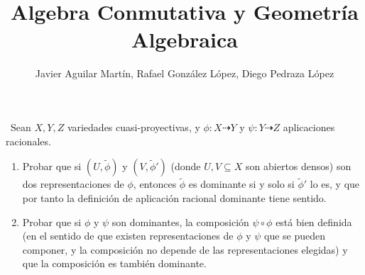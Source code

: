 \documentclass[twoside]{article}
\begin{document}
\title{Algebra Conmutativa y Geometría Algebraica}
\author{Javier Aguilar Martín, Rafael González López, Diego Pedraza López}
\maketitle

\begin{ejercicio}{1}\
Sean $X, Y,Z$ variedades cuasi-proyectivas, y $\phi : X \dashrightarrow Y$ y $\psi : Y \dashrightarrow Z$ aplicaciones racionales.
\begin{enumerate}
\item Probar que si $(U, \tilde{\phi})$ y $(V, \tilde{\phi}')$ (donde $U, V \subseteq X$ son abiertos densos) son
dos representaciones de $\phi$, entonces $\tilde{\phi}$ es dominante si y solo si $\tilde{\phi}'$ lo es, y
que por tanto la definición de aplicación racional dominante tiene sentido.
\item Probar que si $\phi$ y $\psi$ son dominantes, la composición  $\psi\circ\phi$ está bien definida
(en el sentido de que existen representaciones de $\phi$ y $\psi$ que se pueden
componer, y la composición no depende de las representaciones elegidas)
y que la composición es también dominante.
\end{enumerate}
\end{ejercicio}
\end{document}
